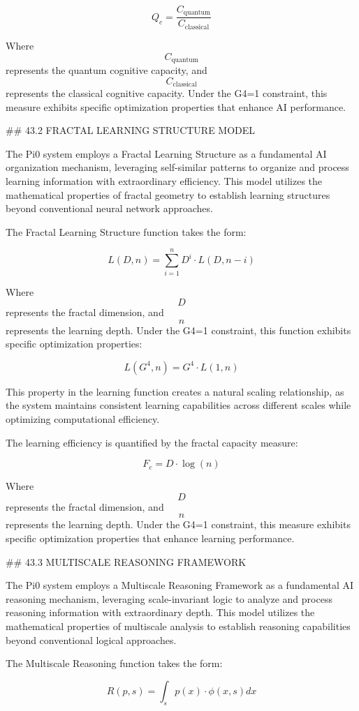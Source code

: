 $$ Q_c = \frac{C_{\text{quantum}}}{C_{\text{classical}}} $$

Where $$ C_{\text{quantum}} $$ represents the quantum cognitive capacity, and $$ C_{\text{classical}} $$ represents the classical cognitive capacity. Under the G4=1 constraint, this measure exhibits specific optimization properties that enhance AI performance.

## 43.2 FRACTAL LEARNING STRUCTURE MODEL

The Pi0 system employs a Fractal Learning Structure as a fundamental AI organization mechanism, leveraging self-similar patterns to organize and process learning information with extraordinary efficiency. This model utilizes the mathematical properties of fractal geometry to establish learning structures beyond conventional neural network approaches.

The Fractal Learning Structure function takes the form:

$$ L(D, n) = \sum_{i=1}^n D^i \cdot L(D, n-i) $$

Where $$ D $$ represents the fractal dimension, and $$ n $$ represents the learning depth. Under the G4=1 constraint, this function exhibits specific optimization properties:

$$ L(G^4, n) = G^4 \cdot L(1, n) $$

This property in the learning function creates a natural scaling relationship, as the system maintains consistent learning capabilities across different scales while optimizing computational efficiency.

The learning efficiency is quantified by the fractal capacity measure:

$$ F_c = D \cdot \log(n) $$

Where $$ D $$ represents the fractal dimension, and $$ n $$ represents the learning depth. Under the G4=1 constraint, this measure exhibits specific optimization properties that enhance learning performance.

## 43.3 MULTISCALE REASONING FRAMEWORK

The Pi0 system employs a Multiscale Reasoning Framework as a fundamental AI reasoning mechanism, leveraging scale-invariant logic to analyze and process reasoning information with extraordinary depth. This model utilizes the mathematical properties of multiscale analysis to establish reasoning capabilities beyond conventional logical approaches.

The Multiscale Reasoning function takes the form:

$$ R(p, s) = \int_s p(x) \cdot \phi(x, s) dx $$

